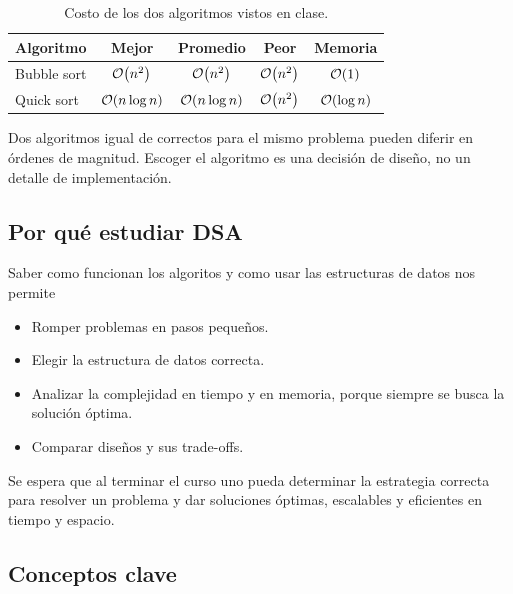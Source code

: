 \documentclass[11pt,letterpaper]{article}
\begin{document}
\begin{table}[htbp]
  \centering
  \begin{tabular}{lcccc}
    \toprule
    \textbf{Algoritmo} & \textbf{Mejor} & \textbf{Promedio}
      & \textbf{Peor} & \textbf{Memoria} \\
    \midrule
    Bubble sort & $\mathcal{O}\!\left(n^2\right)$      & $\mathcal{O}\!\left(n^2\right)$
                & $\mathcal{O}\!\left(n^2\right)$      & $\mathcal{O}\!\left(1\right)$      \\
    Quick sort  & $\mathcal{O}\!\left(n \log n\right)$ & $\mathcal{O}\!\left(n \log n\right)$
                & $\mathcal{O}\!\left(n^2\right)$      & $\mathcal{O}\!\left(\log n\right)$ \\
    \bottomrule
  \end{tabular}
  \caption{Costo de los dos algoritmos vistos en clase.}
  \label{tab:ordenamiento}
\end{table}

\begin{idea}
  Dos algoritmos igual de correctos para el mismo problema pueden
  diferir en órdenes de magnitud. Escoger el algoritmo es una decisión
  de diseño, no un detalle de implementación.
\end{idea}

\newpage


\subsection*{Por qué estudiar DSA}

Saber como funcionan los algoritos y como usar las estructuras de datos
nos permite
\begin{itemize}[itemsep=0.1em]
    \item Romper problemas en pasos pequeños.
    \item Elegir la estructura de datos correcta.
    \item Analizar la complejidad en tiempo y en memoria, porque
          siempre se busca la solución óptima.
    \item Comparar diseños y sus trade-offs.
\end{itemize}

Se espera que al terminar el curso uno pueda determinar la estrategia
correcta para resolver un problema y dar soluciones óptimas, escalables
y eficientes en tiempo y espacio.


\subsection*{Conceptos clave}
\end{document}

